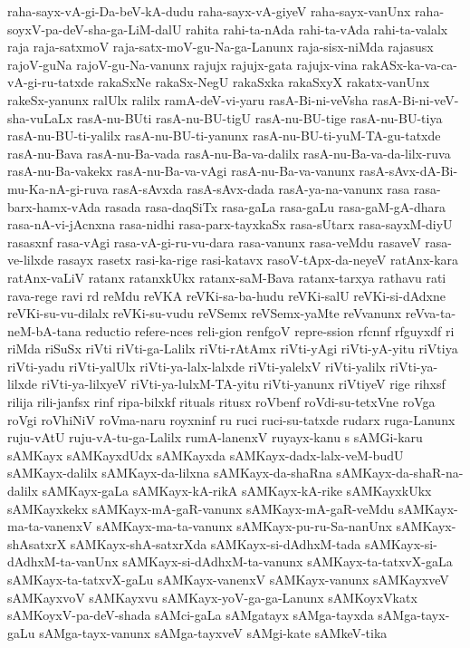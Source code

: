 {raha-sayx-vA-gi-Da-beV-kA-dudu
raha-sayx-vA-giyeV
raha-sayx-vanUnx
raha-soyxV-pa-deV-sha-ga-LiM-dalU
rahita
rahi-ta-nAda
rahi-ta-vAda
rahi-ta-valalx
raja
raja-satxmoV
raja-satx-moV-gu-Na-ga-Lanunx
raja-sisx-niMda
rajasusx
rajoV-guNa
rajoV-gu-Na-vanunx
rajujx
rajujx-gata
rajujx-vina
rakASx-ka-va-ca-vA-gi-ru-tatxde
rakaSxNe
rakaSx-NegU
rakaSxka
rakaSxyX
rakatx-vanUnx
rakeSx-yanunx
ralUlx
ralilx
ramA-deV-vi-yaru
rasA-Bi-ni-veVsha
rasA-Bi-ni-veV-sha-vuLaLx
rasA-nu-BUti
rasA-nu-BU-tigU
rasA-nu-BU-tige
rasA-nu-BU-tiya
rasA-nu-BU-ti-yalilx
rasA-nu-BU-ti-yanunx
rasA-nu-BU-ti-yuM-TA-gu-tatxde
rasA-nu-Bava
rasA-nu-Ba-vada
rasA-nu-Ba-va-dalilx
rasA-nu-Ba-va-da-lilx-ruva
rasA-nu-Ba-vakekx
rasA-nu-Ba-va-vAgi
rasA-nu-Ba-va-vanunx
rasA-sAvx-dA-Bi-mu-Ka-nA-gi-ruva
rasA-sAvxda
rasA-sAvx-dada
rasA-ya-na-vanunx
rasa
rasa-barx-hamx-vAda
rasada
rasa-daqSiTx
rasa-gaLa
rasa-gaLu
rasa-gaM-gA-dhara
rasa-nA-vi-jAcnxna
rasa-nidhi
rasa-parx-tayxkaSx
rasa-sUtarx
rasa-sayxM-diyU
rasasxnf
rasa-vAgi
rasa-vA-gi-ru-vu-dara
rasa-vanunx
rasa-veMdu
rasaveV
rasa-ve-lilxde
rasayx
rasetx
rasi-ka-rige
rasi-katavx
rasoV-tApx-da-neyeV
ratAnx-kara
ratAnx-vaLiV
ratanx
ratanxkUkx
ratanx-saM-Bava
ratanx-tarxya
rathavu
rati
rava-rege
ravi
rd
reMdu
reVKA
reVKi-sa-ba-hudu
reVKi-salU
reVKi-si-dAdxne
reVKi-su-vu-dilalx
reVKi-su-vudu
reVSemx
reVSemx-yaMte
reVvanunx
reVva-ta-neM-bA-tana
reductio
refere-nces
reli-gion
renfgoV
repre-ssion
rfcnnf
rfguyxdf
ri
riMda
riSuSx
riVti
riVti-ga-Lalilx
riVti-rAtAmx
riVti-yAgi
riVti-yA-yitu
riVtiya
riVti-yadu
riVti-yalUlx
riVti-ya-lalx-lalxde
riVti-yalelxV
riVti-yalilx
riVti-ya-lilxde
riVti-ya-lilxyeV
riVti-ya-lulxM-TA-yitu
riVti-yanunx
riVtiyeV
rige
rihxsf
rilija
rili-janfsx
rinf
ripa-bilxkf
rituals
ritusx
roVbenf
roVdi-su-tetxVne
roVga
roVgi
roVhiNiV
roVma-naru
royxninf
ru
ruci
ruci-su-tatxde
rudarx
ruga-Lanunx
ruju-vAtU
ruju-vA-tu-ga-Lalilx
rumA-lanenxV
ruyayx-kanu
s
sAMGi-karu
sAMKayx
sAMKayxdUdx
sAMKayxda
sAMKayx-dadx-lalx-veM-budU
sAMKayx-dalilx
sAMKayx-da-lilxna
sAMKayx-da-shaRna
sAMKayx-da-shaR-na-dalilx
sAMKayx-gaLa
sAMKayx-kA-rikA
sAMKayx-kA-rike
sAMKayxkUkx
sAMKayxkekx
sAMKayx-mA-gaR-vanunx
sAMKayx-mA-gaR-veMdu
sAMKayx-ma-ta-vanenxV
sAMKayx-ma-ta-vanunx
sAMKayx-pu-ru-Sa-nanUnx
sAMKayx-shAsatxrX
sAMKayx-shA-satxrXda
sAMKayx-si-dAdhxM-tada
sAMKayx-si-dAdhxM-ta-vanUnx
sAMKayx-si-dAdhxM-ta-vanunx
sAMKayx-ta-tatxvX-gaLa
sAMKayx-ta-tatxvX-gaLu
sAMKayx-vanenxV
sAMKayx-vanunx
sAMKayxveV
sAMKayxvoV
sAMKayxvu
sAMKayx-yoV-ga-ga-Lanunx
sAMKoyxVkatx
sAMKoyxV-pa-deV-shada
sAMci-gaLa
sAMgatayx
sAMga-tayxda
sAMga-tayx-gaLu
sAMga-tayx-vanunx
sAMga-tayxveV
sAMgi-kate
sAMkeV-tika
}

